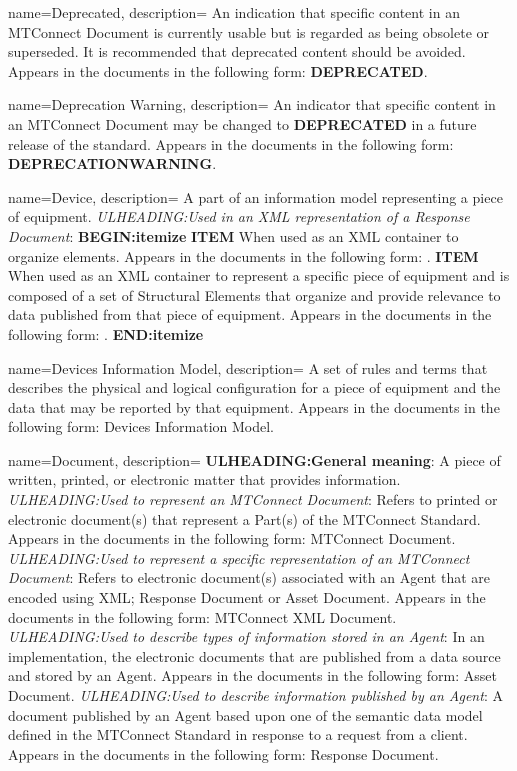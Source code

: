{
    name={Deprecated},
	description={
	An indication that specific content in an \gls{MTConnect Document} is currently usable but is regarded as being obsolete or superseded. It is recommended that deprecated content should be avoided.
	Appears in the documents in the following form: \textbf{DEPRECATED}.
}
}

{
    name={Deprecation Warning},
	description={
	An indicator that specific content in an \gls{MTConnect Document} may be changed to \textbf{DEPRECATED} in a future release of the standard.
	Appears in the documents in the following form: \textbf{DEPRECATIONWARNING}.
}
}

{
    name={Device},
	description={
	A part of an information model representing a piece of equipment.  
	\textit{ULHEADING:Used in an XML representation of a \gls{Response Document}}:
    \textbf{BEGIN:itemize}
	\textbf{ITEM} When used as an XML container to organize  elements.
	Appears in the documents in the following form: .
	\textbf{ITEM} When used as an XML container to represent a specific piece of equipment and is composed of a set of \glspl{Structural Element} that organize and provide relevance to data published from that piece of equipment.
	Appears in the documents in the following form: .
	\textbf{END:itemize}
}
}

{
    name={Devices Information Model},
	description={
	A set of rules and terms that describes the physical and logical configuration for a piece of equipment and the data that may be reported by that equipment.    
	Appears in the documents in the following form: \gls{Devices Information Model}.
}
}

{
    name={Document},
	description={
	\textbf{ULHEADING:General meaning}:
	A piece of written, printed, or electronic matter that provides information.
	\textit{ULHEADING:Used to represent an \gls{MTConnect Document}}:
	Refers to printed or electronic document(s) that represent a \gls{Part}(s) of the MTConnect Standard.
	Appears in the documents in the following form: \gls{MTConnect Document}.
	\textit{ULHEADING:Used to represent a specific representation of an \gls{MTConnect Document}}:
	Refers to electronic document(s) associated with an \gls{Agent} that are encoded using XML; \gls{Response Document} or \gls{Asset Document}.
	Appears in the documents in the following form: \gls{MTConnect XML Document}.
	\textit{ULHEADING:Used to describe types of information stored in an \gls{Agent}}:
	In an implementation, the electronic documents that are published from a data source and stored by an \gls{Agent}.
	Appears in the documents in the following form: \gls{Asset Document}.
	\textit{ULHEADING:Used to describe information published by an \gls{Agent}}:
	A document published by an \gls{Agent} based upon one of the \gls{semantic data model} defined in the MTConnect Standard in response to a request from a client.  
	Appears in the documents in the following form: \gls{Response Document}.
}
}

